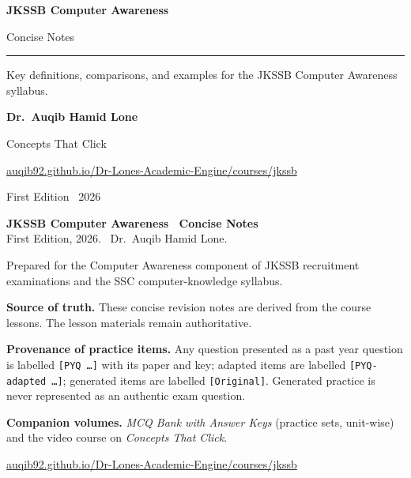 \documentclass[11pt,a4paper,oneside]{report}
\renewcommand{\BAuthor}{Dr.\ Auqib Hamid Lone}
\renewcommand{\BWeb}{auqib92.github.io/Dr-Lones-Academic-Engine/courses/jkssb}
\renewcommand{\BWebURL}{https://auqib92.github.io/Dr-Lones-Academic-Engine/courses/jkssb/}
\begin{document}
\ifshowcover\makecover\fi

\thispagestyle{plain}
\begin{center}
  \vspace*{2.2cm}
  {\sffamily\bfseries\color{bookteal}\Huge JKSSB Computer Awareness\par}
  \vspace{0.4cm}
  {\sffamily\color{bookgolddark}\Large Concise Notes\par}
  \vspace{0.2cm}
  {\color{bookteal}\rule{6cm}{1.5pt}}
  \vspace{0.6cm}

  {\large Key definitions, comparisons, and examples for the JKSSB Computer
  Awareness syllabus.\par}
  \vspace{1.4cm}

  {\sffamily\bfseries\large \BAuthor\par}
  \vspace{0.2cm}
  {\color{bookgolddark}\large Concepts That Click\par}
  \vspace{0.1cm}
  {\small \href{\BWebURL}{\BWeb}\par}
  \vspace{1.0cm}

  {\small First Edition \textperiodcentered\ 2026\par}
\end{center}
\clearpage

\thispagestyle{plain}
\vspace*{\fill}
{\small
\noindent\textbf{JKSSB Computer Awareness \textemdash\ Concise Notes}\\
First Edition, 2026. \textcopyright\ \BAuthor.

\medskip
\noindent Prepared for the Computer Awareness component of JKSSB recruitment
examinations and the SSC computer-knowledge syllabus.

\medskip
\noindent\textbf{Source of truth.} These concise revision notes are derived from
the course lessons. The lesson materials remain authoritative.

\medskip
\noindent\textbf{Provenance of practice items.} Any question presented as a past
year question is labelled \texttt{[PYQ~\ldots]} with its paper and key; adapted
items are labelled \texttt{[PYQ-adapted~\ldots]}; generated items are labelled
\texttt{[Original]}. Generated practice is never represented as an authentic exam
question.

\medskip
\noindent\textbf{Companion volumes.} \emph{MCQ Bank with Answer Keys}
(practice sets, unit-wise) and the video course on \emph{Concepts That Click}.

\medskip
\noindent\href{\BWebURL}{\BWeb}
}
\vspace*{\fill}
\clearpage
\end{document}
